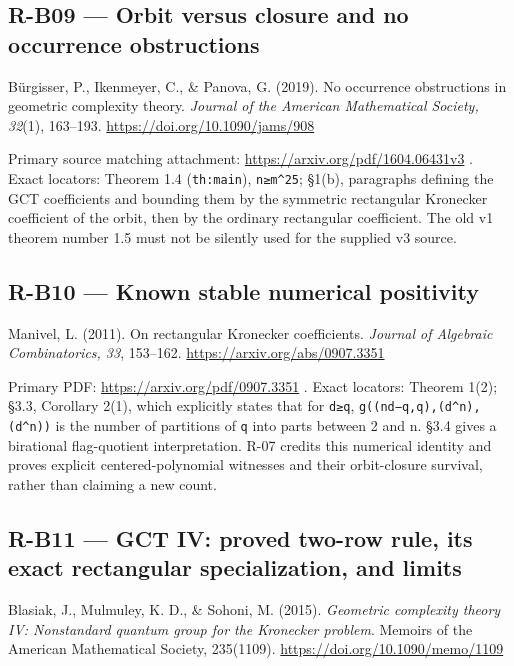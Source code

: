 \documentclass[11pt,a4paper]{article}
\theoremstyle{definition}\newtheorem{definition}{Definition}
\begin{document}
\subsection{R-B09 --- Orbit versus closure and no occurrence
obstructions}\label{r-b09--orbit-versus-closure-and-no-occurrence-obstructions}

Bürgisser, P., Ikenmeyer, C., \& Panova, G. (2019). No occurrence
obstructions in geometric complexity theory. \emph{Journal of the
American Mathematical Society, 32}(1), 163--193.
\url{https://doi.org/10.1090/jams/908}

Primary source matching attachment:
\url{https://arxiv.org/pdf/1604.06431v3} . Exact locators: Theorem 1.4
(\texttt{th:main}), \texttt{n≥m\^{}25}; §1(b), paragraphs defining the
GCT coefficients and bounding them by the symmetric rectangular
Kronecker coefficient of the orbit, then by the ordinary rectangular
coefficient. The old v1 theorem number 1.5 must not be silently used for
the supplied v3 source.

\subsection{R-B10 --- Known stable numerical
positivity}\label{r-b10--known-stable-numerical-positivity}

Manivel, L. (2011). On rectangular Kronecker coefficients. \emph{Journal
of Algebraic Combinatorics, 33}, 153--162.
\url{https://arxiv.org/abs/0907.3351}

Primary PDF: \url{https://arxiv.org/pdf/0907.3351} . Exact locators:
Theorem 1(2); §3.3, Corollary 2(1), which explicitly states that for
\texttt{d≥q}, \texttt{g((nd−q,q),(d\^{}n),(d\^{}n))} is the number of
partitions of \texttt{q} into parts between 2 and n. §3.4 gives a
birational flag-quotient interpretation. R-07 credits this numerical
identity and proves explicit centered-polynomial witnesses and their
orbit-closure survival, rather than claiming a new count.

\subsection{R-B11 --- GCT IV: proved two-row rule, its exact rectangular
specialization, and
limits}\label{r-b11--gct-iv-proved-two-row-rule-its-exact-rectangular-specialization-and-limits}

Blasiak, J., Mulmuley, K. D., \& Sohoni, M. (2015). \emph{Geometric
complexity theory IV: Nonstandard quantum group for the Kronecker
problem}. Memoirs of the American Mathematical Society, 235(1109).
\url{https://doi.org/10.1090/memo/1109}
\end{document}
